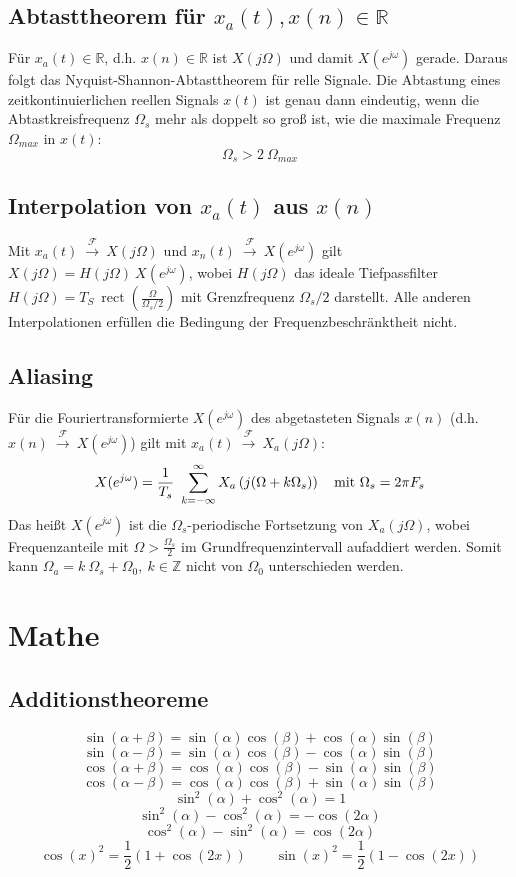 \documentclass[10pt,a4paper]{article}
\newcommand{\fancythumb}[2]{
	\addthumb{#1}{\large\sffamily\textbf{\space\space#1\vspace{5pt}}}{white}{#2}
}
\newcommand{\ftransform}{
	~\xrightarrow{~\mathcal{F}~}~
}
\DeclareMathOperator{\rect}{rect}
\begin{document}
\subsection*{Abtasttheorem für $x_a(t), x(n) \in \mathbb R$}
Für $x_a(t) \in \mathbb R$, d.h. $x(n) \in \mathbb R$ ist $X(j\Omega)$ und damit $X(e^{j\omega})$ gerade. Daraus folgt das Nyquist-Shannon-Abtasttheorem für relle Signale. Die Abtastung eines zeitkontinuierlichen reellen Signals $x(t)$ ist genau dann eindeutig, wenn die Abtastkreisfrequenz $\Omega_s$ mehr als doppelt so groß ist, wie die maximale Frequenz $\Omega_{max}$ in $x(t)$:
\[ \Omega_s > 2 ~ \Omega_{max} \]

\subsection*{Interpolation von $x_a(t)$ aus $x(n)$}
Mit $x_a(t) \ftransform X(j\Omega)$ und $x_n(t) \ftransform X \left(e^{j\omega} \right)$ gilt $X(j\Omega) = H(j\Omega) ~ X(e^{j\omega})$, wobei $H(j\Omega)$ das ideale Tiefpassfilter $H(j\Omega) = T_S ~ \rect \left(\frac{\Omega}{\Omega_s / 2} \right)$ mit Grenzfrequenz $\Omega_s / 2$ darstellt. Alle anderen Interpolationen erfüllen die Bedingung der Frequenzbeschränktheit nicht.

\subsection*{Aliasing}
Für die Fouriertransformierte $X(e^{j\omega})$ des abgetasteten Signals $x(n)$ (d.h. $x(n) \ftransform X(e^{j\omega})$) gilt mit $x_a(t) \ftransform X_a(j\Omega)$:
\[
	X(e^{j\omega}) = \frac{1}{T_s} ~ \sum_{k=-\infty}^{\infty} X_a\left(j(\Omega + k \Omega_s) \right) ~~~ \textnormal{mit } \Omega_s = 2 \pi F_s
\]
Das heißt $X \left(e^{j\omega} \right)$ ist die $\Omega_s$-periodische Fortsetzung von $X_a(j\Omega)$, wobei Frequenzanteile mit $\Omega > \frac{\Omega_s}{2}$ im Grundfrequenzintervall aufaddiert werden. Somit kann $\Omega_a = k ~ \Omega_s + \Omega_0, ~ k \in \mathbb Z$ nicht von $\Omega_0$ unterschieden werden.

\newpage
\section*{Mathe}
\fancythumb{Mathe}{Green}
\subsection*{Additionstheoreme}
\[\sin(\alpha + \beta)=\sin(\alpha)\cos(\beta)+\cos(\alpha)\sin(\beta)\]
\[\sin(\alpha - \beta)=\sin(\alpha)\cos(\beta)-\cos(\alpha)\sin(\beta)\]
\[\cos(\alpha + \beta)=\cos(\alpha)\cos(\beta)-\sin(\alpha)\sin(\beta)\]
\[\cos(\alpha - \beta)=\cos(\alpha)\cos(\beta)+\sin(\alpha)\sin(\beta)\]
\[\sin^2(\alpha)+\cos^2(\alpha)=1\]
\[\sin^2(\alpha)-\cos^2(\alpha)=-\cos(2\alpha)\]
\[\cos^2(\alpha)-\sin^2(\alpha)=\cos(2\alpha)\]
\[\cos(x)^2 = \frac{1}{2} \left(1 + \cos(2x) \right) \qquad \sin(x)^2 = \frac{1}{2} \left(1 - \cos(2x) \right)\]
\end{document}
